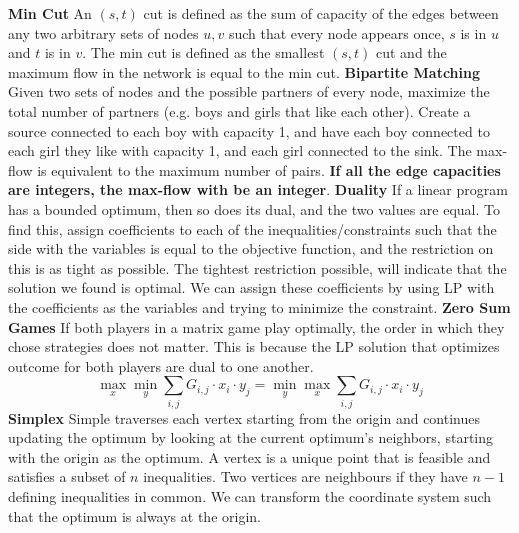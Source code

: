 \documentclass{article}
\begin{document}
\begin{multicols}{2}
\textbf{Min Cut} \newline 
An $(s, t)$ cut is defined as the sum of capacity of the edges between any two arbitrary sets of nodes $u, v$ such that every node appears once, $s$ is in $u$ and $t$ is in $v$. The min cut is defined as the smallest $(s, t)$ cut and the maximum flow in the network is equal to the min cut. \newline 
\textbf{Bipartite Matching} \newline 
Given two sets of nodes and the possible partners of every node, maximize the total number of partners (e.g. boys and girls that like each other). Create a source connected to each boy with capacity 1, and have each boy connected to each girl they like with capacity 1, and each girl connected to the sink. The max-flow is equivalent to the maximum number of pairs. \textbf{If all the edge capacities are integers, the max-flow with be an integer}. \newline 
\textbf{Duality} \newline 
If a linear program has a bounded optimum, then so does its dual, and the two values are equal. To find this, assign coefficients to each of the inequalities/constraints such that the side with the variables is equal to the objective function, and the restriction on this is as tight as possible. The tightest restriction possible, will indicate that the solution we found is optimal. We can assign these coefficients by using LP with the coefficients as the variables and trying to minimize the constraint. \newline
\textbf{Zero Sum Games} \newline 
If both players in a matrix game play optimally, the order in which they chose strategies does not matter. This is because the LP solution that optimizes outcome for both players are dual to one another. \newline 
$$\max_x \min_y \sum_{i, j} G_{i, j} \cdot x_i \cdot y_j = \min_y \max_x \sum_{i, j} G_{i, j} \cdot x_i \cdot y_j$$
\textbf{Simplex} \newline 
Simple traverses each vertex starting from the origin and continues updating the optimum by looking at the current optimum's neighbors, starting with the origin as the optimum. A vertex is a unique point that is feasible and satisfies a subset of $n$ inequalities. Two vertices are neighbours if they have $n-1$ defining inequalities in common. We can transform the coordinate system such that the optimum is always at the origin. 

\end{multicols}
\end{document}
